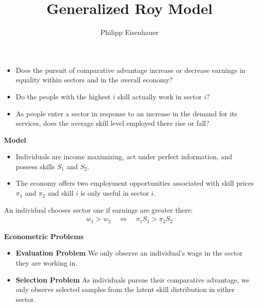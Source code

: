 

\title{Generalized Roy Model}
\author{Philipp Eisenhauer}

\date{}

\let\otp\titlepage


\maketitle

\begin{frame}


\begin{itemize}
\item Does the pursuit of comparative advantage increase or decrease earnings in equality within sectors and in the overall economy?
\item Do the people with the highest $i$ skill actually work in sector $i$?
\item As people enter a sector in response to an increase in the demand for its services, does the average skill level employed there rise or fall?
\end{itemize}

\end{frame}


\begin{frame}
\textbf{\citet{Roy.1951} Model}
\begin{itemize}
\item Individuals are income maximizing, act under perfect information, and possess skills $S_1$ and $S_2$.
\item The economy offers two employment opportunities associated with skill prices $\pi_1$ and $\pi_2$ and skill $i$ is only useful in sector $i$.
\end{itemize}\vspace{0.5cm}

An individual chooses sector one if earnings are greater there:
\begin{align*}
w_1 > w_2 \quad\Longleftrightarrow\quad \pi_1 S_1 > \pi_2 S_2
\end{align*}
\end{frame}


\begin{frame}
\textbf{Econometric Problems}

\begin{itemize}
\item \textbf{Evaluation Problem} We only observe an individual's wage in the sector they are working in.
\item \textbf{Selection Problem} As individuals pursue their comparative advantage, we only observe selected samples from the latent skill distribution in either sector.
\end{itemize}\vspace{0.5cm}


\end{frame}



